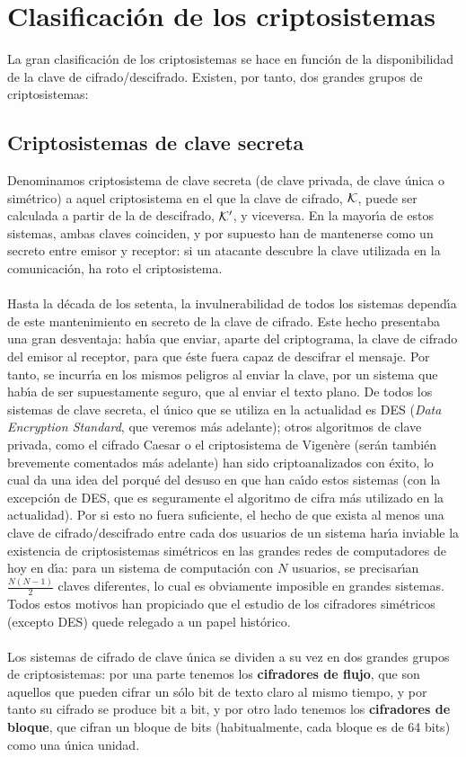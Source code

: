 \section{Clasificaci\'on de los criptosistemas}
La gran clasificaci\'on de los criptosistemas se hace en funci\'on
de la disponibilidad de la clave de cifrado/descifrado. Existen, por tanto,
dos grandes grupos de criptosistemas:
\subsection{Criptosistemas de clave secreta}
Denominamos criptosistema de clave secreta (de clave privada, de clave \'unica 
o sim\'etrico) a aquel criptosistema en el que la clave de cifrado, ${\cal K}$, 
puede ser calculada a partir de la de descifrado, ${\cal K}^{\prime}$, y
viceversa. En la mayor\'{\i}a de estos sistemas, ambas claves coinciden, y por
supuesto han de mantenerse como un secreto entre emisor y receptor: si un 
atacante descubre la clave utilizada en la comunicaci\'on, ha roto el 
criptosistema.\\
\\Hasta la d\'ecada de los setenta, la invulnerabilidad de todos
los sistemas depend\'{\i}a de este man\-te\-ni\-mien\-to en secreto de la clave 
de cifrado. Este hecho presentaba una gran desventaja: hab\'{\i}a que enviar, 
aparte del criptograma, la clave de cifrado del emisor al receptor, para que 
\'este fuera capaz de descifrar el mensaje. Por tanto, se incurr\'{\i}a en los
mismos peligros al enviar la clave, por un sistema que hab\'{\i}a de
ser supuestamente seguro, que al enviar el texto plano. De todos
los sistemas de clave secreta, el \'unico que se utiliza en la actualidad
es DES ({\it Data Encryption Standard}, que veremos m\'as
adelante); otros algoritmos de clave privada, como el cifrado Caesar o el 
criptosistema de Vigen\`ere (ser\'an tambi\'en brevemente comentados m\'as 
adelante) han sido criptoanalizados con \'exito, lo cual da una idea del 
porqu\'e del desuso en que han ca\'{\i}do estos sistemas (con la excepci\'on de 
DES, que es seguramente el algoritmo de cifra m\'as utilizado en la actualidad).
Por si esto no fuera suficiente, el hecho de que exista al menos una clave de 
cifrado/descifrado entre cada dos usuarios de un sistema har\'{\i}a inviable la 
existencia de criptosistemas sim\'etricos en las grandes redes de computadores
de hoy en d\'{\i}a: para un sistema de computaci\'on con $N$ usuarios,
se precisar\'{\i}an $\frac{N(N-1)}{2}$ claves diferentes, lo cual es obviamente 
imposible en grandes sistemas. Todos estos motivos han propiciado que el 
estudio de los cifradores sim\'etricos (excepto DES) quede relegado a un papel 
hist\'orico.\\
\\Los sistemas de cifrado de clave \'unica se dividen a su vez en dos grandes 
grupos de criptosistemas: por una parte tenemos los {\bf cifradores de flujo}, 
que son aquellos que pueden cifrar un s\'olo bit de texto claro al mismo 
tiempo, y por tanto su cifrado se produce bit a bit, y por otro lado tenemos 
los {\bf cifradores de bloque}, que cifran un bloque de bits (habitualmente, 
cada bloque es de 64 bits) como una \'unica unidad.

